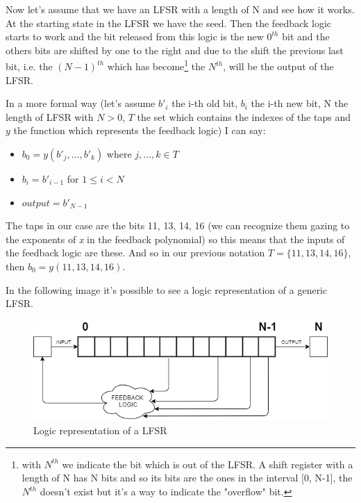 \documentclass[a4paper]{report}
\begin{document}
\noindent Now let's assume that we have an LFSR with a length of N and see how it works. At the starting state in the LFSR we have the seed. Then the feedback logic starts to work and the bit released from this logic is the new $0^{th}$ bit and the others bits are shifted by one to the right and due to the shift the previous last bit, i.e. the $(N-1)^{th}$ which has become\footnote{with $N^{th}$ we indicate the bit which is out of the LFSR. A shift register with a length of N has N bits and so its bits are the ones in the interval [0, N-1], the  $N^{th}$ doesn't exist but it's a way to indicate the "overflow" bit.} the $N^{th}$, will be the output of the LFSR.

\noindent In a more formal way (let's assume $b'_i$ the i-th old bit, $b_i$ the i-th new bit, N the length of LFSR with $N>0$, $T$ the set which contains the indexes of the taps and $y$ the function which represents the feedback logic) I can say:
\begin{itemize}
	\item $b_0 = y(b'_j, ..., b'_k)$ where  $j, ..., k \in T$
	\item $b_i = b'_{i-1}$  for $1\leq i<N$
	\item $output = b'_{N-1}$
\end{itemize}

\noindent The taps in our case are the bits 11, 13, 14, 16 (we can recognize them gazing to the exponents of \emph{x} in the feedback polynomial) so this means that the inputs of the feedback logic are these. And so in our previous notation $T=\{11, 13, 14, 16\}$, then $b_0 = y(11, 13, 14, 16)$.

\noindent In the following image it's possible to see a logic representation of a generic LFSR.
\begin{figure}[htbp]
	\centering
	\includegraphics[scale=0.5]{img/LFSR-functionality.png}
	\caption{Logic representation of a LFSR}
\end{figure}
\end{document}
